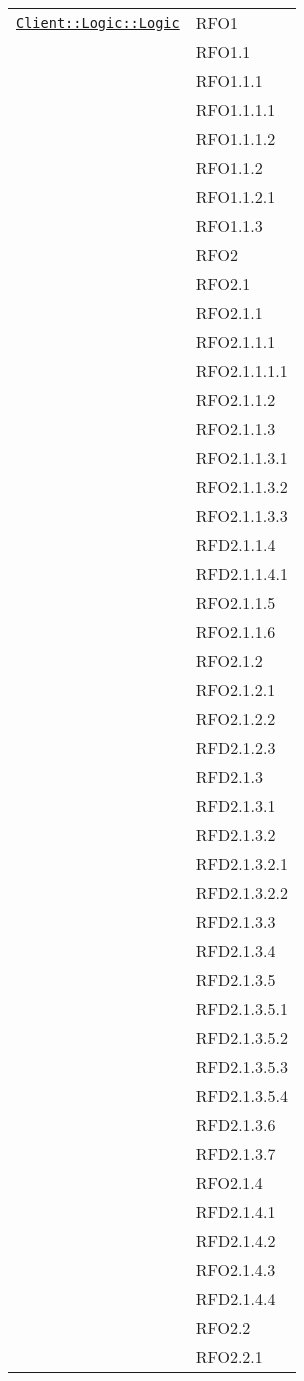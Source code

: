 \begin{longtable}{|>{\centering}m{10cm}|m{3cm}<{\centering}|}
\hyperref[Client::Logic::Logic]{\texttt{Client::Logic::Logic}} & RFO1\\
& RFO1.1\\
& RFO1.1.1\\
& RFO1.1.1.1\\
& RFO1.1.1.2\\
& RFO1.1.2\\
& RFO1.1.2.1\\
& RFO1.1.3\\
& RFO2\\
& RFO2.1\\
& RFO2.1.1\\
& RFO2.1.1.1\\
& RFO2.1.1.1.1\\
& RFO2.1.1.2\\
& RFO2.1.1.3\\
& RFO2.1.1.3.1\\
& RFO2.1.1.3.2\\
& RFO2.1.1.3.3\\
& RFD2.1.1.4\\
& RFD2.1.1.4.1\\
& RFO2.1.1.5\\
& RFO2.1.1.6\\
& RFO2.1.2\\
& RFO2.1.2.1\\
& RFO2.1.2.2\\
& RFD2.1.2.3\\
& RFD2.1.3\\
& RFD2.1.3.1\\
& RFD2.1.3.2\\
& RFD2.1.3.2.1\\
& RFD2.1.3.2.2\\
& RFD2.1.3.3\\
& RFD2.1.3.4\\
& RFD2.1.3.5\\
& RFD2.1.3.5.1\\
& RFD2.1.3.5.2\\
& RFD2.1.3.5.3\\
& RFD2.1.3.5.4\\
& RFD2.1.3.6\\
& RFD2.1.3.7\\
& RFO2.1.4\\
& RFD2.1.4.1\\
& RFD2.1.4.2\\
& RFO2.1.4.3\\
& RFD2.1.4.4\\
& RFO2.2\\
& RFO2.2.1\\

\end{longtable}
